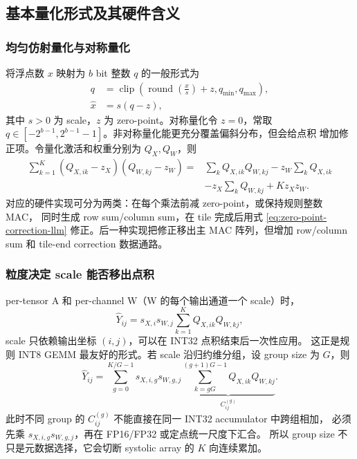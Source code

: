 \subsection{基本量化形式及其硬件含义}

\subsubsection{均匀仿射量化与对称量化}

将浮点数 $x$ 映射为 $b$ bit 整数 $q$ 的一般形式为
\begin{align}
  q &= \operatorname{clip}\!\left(
       \operatorname{round}\!\left(\frac{x}{s}\right)+z,
       q_{\min},q_{\max}\right), \\
  \widehat{x} &= s(q-z),
  \label{eq:affine-quant}
\end{align}
其中 $s>0$ 为 scale，$z$ 为 zero-point。对称量化令 $z=0$，常取
$q\in[-2^{b-1},2^{b-1}-1]$。非对称量化能更充分覆盖偏斜分布，但会给点积
增加修正项。令量化激活和权重分别为 $Q_X,Q_W$，则
\begin{align}
  \sum_{k=1}^{K}(Q_{X,ik}-z_X)(Q_{W,kj}-z_W)
  ={}&\sum_k Q_{X,ik}Q_{W,kj}
  -z_W\sum_k Q_{X,ik} \\
  &-z_X\sum_k Q_{W,kj}+Kz_Xz_W.
  \label{eq:zero-point-correction-llm}
\end{align}
对应的硬件实现可分为两类：在每个乘法前减 zero-point，或保持规则整数 MAC，
同时生成 row sum/column sum，在 tile 完成后用式
\eqref{eq:zero-point-correction-llm} 修正。后一种实现把修正移出主 MAC 阵列，但增加
row/column sum 和 tile-end correction 数据通路。

\subsubsection{粒度决定 scale 能否移出点积}

per-tensor A 和 per-channel W（W 的每个输出通道一个 scale）时，
\begin{equation}
  \widehat{Y}_{ij}
  =s_{X,i}s_{W,j}
   \sum_{k=1}^{K}Q_{X,ik}Q_{W,kj},
  \label{eq:outer-scale}
\end{equation}
scale 只依赖输出坐标 $(i,j)$，可以在 INT32 点积结束后一次性应用。
这正是规则 INT8 GEMM 最友好的形式。若 scale 沿归约维分组，设 group size
为 $G$，则
\begin{equation}
  \widehat{Y}_{ij}
  =\sum_{g=0}^{K/G-1}
   s_{X,i,g}s_{W,g,j}
   \underbrace{\sum_{k=gG}^{(g+1)G-1}
   Q_{X,ik}Q_{W,kj}}_{C_{ij}^{(g)}}.
  \label{eq:inner-k-scale}
\end{equation}
此时不同 group 的 $C_{ij}^{(g)}$ 不能直接在同一 INT32 accumulator 中跨组相加，
必须先乘 $s_{X,i,g}s_{W,g,j}$，再在 FP16/FP32 或定点统一尺度下汇合。
所以 group size 不只是元数据选择，它会切断 systolic array 的 $K$ 向连续累加。

